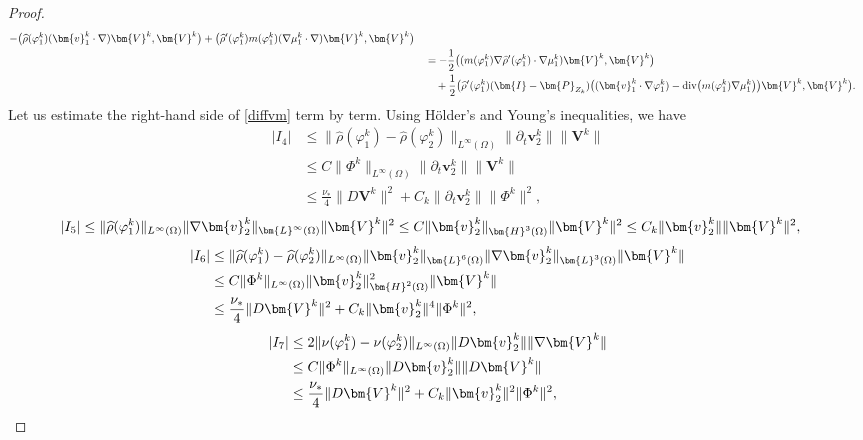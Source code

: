 \documentclass[11pt,reqno]{amsart}
\def\div{\mathrm{div}}
\begin{document}
\begin{proof}
\begin{align*}
- \big(\widehat{\rho}(\varphi_1^k)( \bm{v}_1^k \cdot \nabla)  \bm{V}^k,\bm{V}^k\big)
+ \big(\widehat{\rho}'(\varphi_1^k) m(\varphi_1^k) (\nabla \mu_1^k \cdot\nabla) \bm{V}^k,\bm{V}^k\big)
\\
&\quad = -\frac12 \big( (m(\varphi^k_1)\nabla \widehat{\rho}'(\varphi^k_1)\cdot \nabla \mu^k_1) \bm{V}^k,\bm{V}^k\big)
\notag\\
&\qquad +  \frac12\big(\widehat{\rho}'(\varphi^k_1)(\bm{I}-\bm{P}_{Z_{k}}) \big((\bm{v}^k_1\cdot\nabla\varphi^k_1)-\div \big(m(\varphi^k_1)\nabla \mu^k_1\big)\big)\bm{V}^k,\bm{V}^k\big).
\end{align*}
%
Let us estimate the right-hand side of \eqref{diffvm} term by term. Using H\"{o}lder's and Young's inequalities, we have
%
\begin{align*}
|I_4|
&\leq \|\widehat{\rho}(\varphi_1^k)-\widehat{\rho}(\varphi_2^k)\|_{L^\infty(\Omega)} \|\partial_t  \bm{v}_2^k\|\|\bm{V}^k\|
\\
&\leq C\|\Phi^k\|_{L^\infty(\Omega)}\|\partial_t  \bm{v}_2^k\|\|\bm{V}^k\| \\
&\leq \frac{\nu_*}{4}\|D\bm{V}^k\|^2
+ C_k  \|\partial_t  \bm{v}_2^k\|\|\Phi^k\|^2,
\end{align*}
%
\begin{align}
|I_{5}|
&\le \|\widehat{\rho}(\varphi_1^k)\|_{L^\infty(\Omega)} \|\nabla \bm{v}^{k}_{2}\|_{\bm{L}^\infty(\Omega)}
\|\bm{V}^k\|^2
 \leq C\|\bm{v}^{k}_{2}\|_{\bm{H}^3(\Omega)}\|\bm{V}^k\|^2
 \leq C_k\|\bm{v}^{k}_{2}\| \|\bm{V}^k\|^2,
\notag
\end{align}
%
\begin{align}
|I_{6}|
&\le \|\widehat{\rho}(\varphi_1^k)-\widehat{\rho}(\varphi_2^k)\|_{L^\infty(\Omega)}\| \bm{v}^{k}_{2}\|_{\bm{L}^6(\Omega)}
\|\nabla \bm{v}^{k}_{2}\|_{\bm{L}^3(\Omega)}\|\bm{V}^{k}\|
\notag\\
&\leq C\|\Phi^k\|_{L^\infty(\Omega)}\| \bm{v}^{k}_{2}\|_{\bm{H}^2(\Omega)}^2\|\bm{V}^{k}\|
\notag \\
&\leq \frac{\nu_*}{4}\|D\bm{V}^k\|^2
+ C_k \| \bm{v}^{k}_{2}\|^4 \|\Phi^k\|^2,\notag
\end{align}
%
\begin{align}
|I_{7}|
&\le 2\|\nu(\varphi_1^k)-\nu(\varphi_2^k)\|_{L^\infty(\Omega)}\|D \bm{v}^k_2\|\|\nabla \bm{V}^k\|
\notag\\
& \le C\|\Phi^k\|_{L^\infty(\Omega)}  \|D\bm{v}^k_2\|\|D \bm{V}^k\|
\notag\\
& \le \frac{\nu_*}{4}\|D\bm{V}^k\|^2
+ C_k\|\bm{v}^k_2\|^2\|\Phi^{k}\|^2,
\notag
\end{align}

\end{proof}
\end{document}
